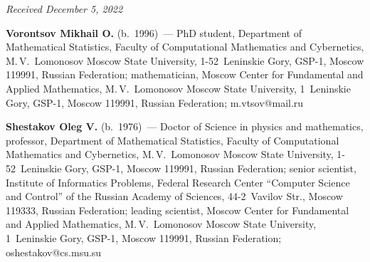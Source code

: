 \vspace*{-6pt}

\hfill{\small\textit{Received December 5, 2022}} 
\Contr

\noindent
\textbf{Vorontsov Mikhail O.} (b.\ 1996)~--- PhD student, Department of Mathematical Statistics, Faculty of Computational Mathematics and Cybernetics, 
M.\,V.~Lomonosov Moscow State University, 1-52~Leninskie Gory, GSP-1, Moscow 119991, Russian Federation;
mathematician,  Moscow Center for Fundamental and Applied Mathematics, 
M.\,V.~Lomonosov Moscow State University, 1~Leninskie Gory, GSP-1, Moscow 119991, Russian Federation;
\mbox{m.vtsov@mail.ru}

\vspace*{5pt}

\noindent
\textbf{Shestakov Oleg V.} (b.\ 1976)~--- Doctor of Science in physics and mathematics, professor, Department of Mathematical Statistics, 
Faculty of Computational Mathematics and Cybernetics, M.\,V.~Lomonosov Moscow State University, 1-52~Leninskie Gory, GSP-1, Moscow 119991, 
Russian Federation; senior scientist, Institute of Informatics Problems, Federal Research Center ``Computer Science and Control'' of 
the Russian Academy of Sciences, 44-2~Vavilov Str., Moscow 119333, Russian Federation; leading scientist, Moscow Center for Fundamental and Applied Mathematics, 
M.\,V.~Lomonosov Moscow State University, 1~Leninskie Gory, GSP-1, Moscow 119991, Russian Federation; \mbox{oshestakov@cs.msu.su}
\label{end\stat}

\renewcommand{\bibname}{\protect\rm Литература} 